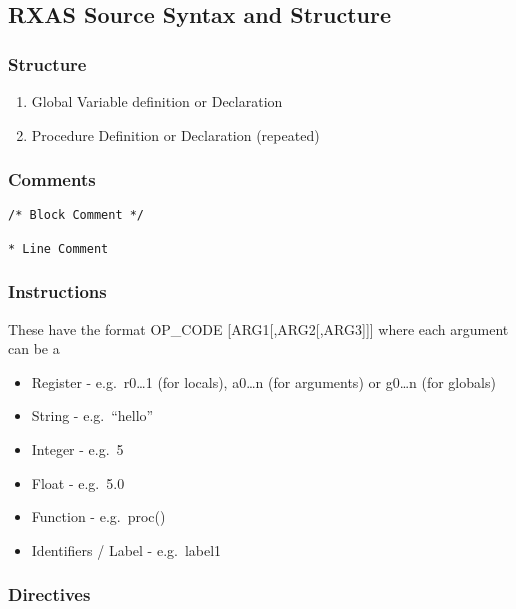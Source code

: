 \hypertarget{rxas-source-syntax-and-structure}{%
\subsection{RXAS Source Syntax and
Structure}\label{rxas-source-syntax-and-structure}}

\hypertarget{structure}{%
\subsubsection{Structure}\label{structure}}

\begin{enumerate}
\def\labelenumi{\arabic{enumi}.}
\tightlist
\item
  Global Variable definition or Declaration
\item
  Procedure Definition or Declaration (repeated)
\end{enumerate}

\hypertarget{comments}{%
\subsubsection{Comments}\label{comments}}

\begin{verbatim}
/* Block Comment */

* Line Comment
\end{verbatim}

\hypertarget{instructions}{%
\subsubsection{Instructions}\label{instructions}}

These have the format OP\_CODE {[}ARG1{[},ARG2{[},ARG3{]}{]}{]} where
each argument can be a

\begin{itemize}
\tightlist
\item
  Register - e.g.~r0\ldots1 (for locals), a0\ldots n (for arguments) or
  g0\ldots n (for globals)
\item
  String - e.g.~``hello''
\item
  Integer - e.g.~5
\item
  Float - e.g.~5.0
\item
  Function - e.g.~proc()
\item
  Identifiers / Label - e.g.~label1
\end{itemize}

\hypertarget{directives}{%
\subsubsection{Directives}\label{directives}}

